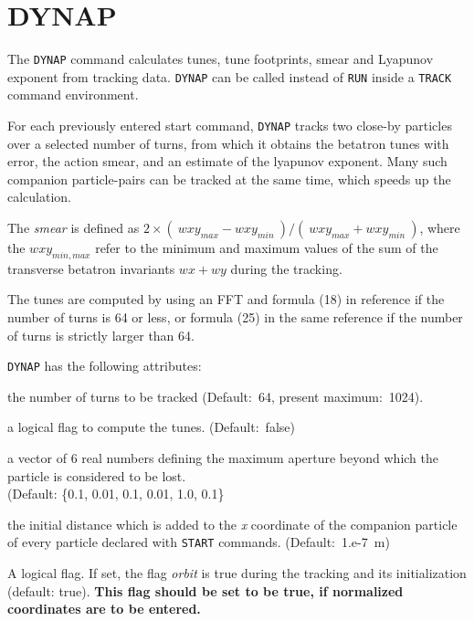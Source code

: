 
\section{DYNAP}

The {\tt DYNAP} command calculates tunes, tune footprints, smear and
Lyapunov exponent from tracking data. {\tt DYNAP} can be called
instead of {\tt RUN} inside a {\tt TRACK} command environment.

 
For each previously entered start command, {\tt DYNAP} tracks two
close-by particles over a selected number of turns, from which it
obtains the betatron tunes with error, the action smear, and an estimate
of the lyapunov exponent. 
Many such companion particle-pairs can be tracked at the same time,
which speeds up the calculation. 

The {\it smear} is defined as  
$2 \times (\ wxy_{max} - wxy_{min}\ ) / (\ wxy_{max} + wxy_{min}\ )$,
where the $wxy_{min,max}$ refer to the  minimum and
maximum values of the sum of the transverse betatron invariants
$wx+wy$ during the tracking. 

The tunes are computed by using an FFT and formula (18) in reference 
\cite{bartolini1995} if the number of turns is 64 or less, or formula (25) in 
the same reference if the number of turns is strictly larger than 64.
 
{\tt DYNAP} has the following attributes: 
\begin{madlist}
    the number of turns to be tracked (Default:~64,
   present maximum:~1024). 
     
    a logical flag to compute the tunes. (Default:~false)
 
    a vector of 6 real numbers defining the maximum
   aperture beyond which the particle is considered to be lost.\\
   (Default: \{0.1, 0.01, 0.1, 0.01, 1.0, 0.1\}
     
    the initial distance which is added to the
   {\it x} coordinate of the companion particle of every particle
   declared with {\tt START} commands. (Default:~1.e-7~m)
   
    A logical flag. If set, the flag {\it orbit} 
   is true during the tracking and its initialization
   (default: true).
   {\bf This flag should be set to be true, if 
     normalized coordinates are to be entered.}
\end{madlist}

